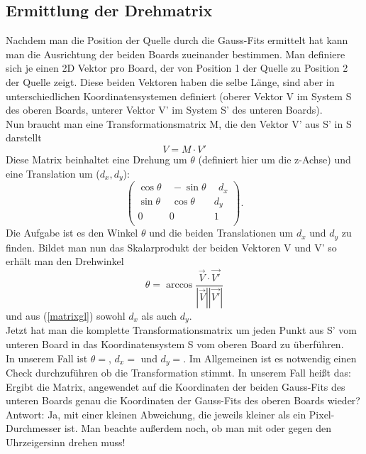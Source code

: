 \documentclass[usenames,dvipsnames]{include/protokollclass}
\begin{document}
	
	{\subsection{Ermittlung der Drehmatrix}}
	Nachdem man die Position der Quelle durch die Gauss-Fits ermittelt hat kann man die Ausrichtung der beiden Boards zueinander bestimmen. Man definiere sich je einen 2D Vektor pro Board, der von Position 1 der Quelle zu Position 2 der Quelle zeigt. Diese beiden Vektoren haben die selbe Länge, sind aber in unterschiedlichen Koordinatensystemen definiert (oberer Vektor V im System S des oberen Boards, unterer Vektor V' im System S' des unteren Boards).\\
	Nun braucht man eine Transformationsmatrix M, die den Vektor V' aus S' in S darstellt
	\begin{equation} \label{matrixgl}
	V=M\cdot V'
	\end{equation}
	Diese Matrix beinhaltet eine Drehung um $\theta$ (definiert hier um die z-Achse) und eine Translation um ($d_x, d_y$):
	\begin{equation*}
	\left( \begin{array}{rrrr}
	\cos \theta  & ~-\sin \theta & ~~d_x  \\
	\sin \theta & ~\cos \theta & d_y  \\
	0 & 0 & 1  \\
	\end{array}\right).
	\end{equation*}
	Die Aufgabe ist es den Winkel $\theta$ und die beiden Translationen um $d_x$ und $d_y$ zu finden.
	Bildet man nun das Skalarprodukt der beiden Vektoren V und V' so erhält man den Drehwinkel
	\begin{equation}
	\theta=\arccos\frac{\vec{V}\cdot \vec{V'}}{|\vec{V}||\vec{V'}|}
	\end{equation}
	und aus (\ref{matrixgl}) sowohl $d_x$ als auch $d_y$.\\
	Jetzt hat man die komplette Transformationsmatrix um jeden Punkt aus S' vom unteren Board in das Koordinatensystem S vom oberen Board zu überführen.\\
	In unserem Fall ist $\theta=$, $d_x=$ und $d_y=$. Im Allgemeinen ist es notwendig einen Check durchzuführen ob die Transformation stimmt. In unserem Fall heißt das: Ergibt die Matrix, angewendet auf die Koordinaten der beiden Gauss-Fits des unteren Boards genau die Koordinaten der Gauss-Fits des oberen Boards wieder? Antwort: Ja, mit einer kleinen Abweichung, die jeweils kleiner als ein Pixel-Durchmesser ist. Man beachte außerdem noch, ob man mit oder gegen den Uhrzeigersinn drehen muss!\\
	
\end{document}
